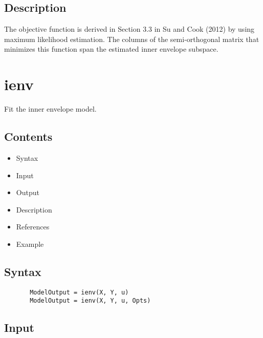 \documentclass[a4paper,11pt,openany]{memoir}
\begin{document}
\subsection*{Description}

\begin{par}
The objective function is derived in Section 3.3 in Su and Cook (2012) by  using maximum likelihood estimation. The columns of the semi-orthogonal matrix that minimizes this function span the estimated inner envelope subspace.
\end{par} \vspace{1em}

\newpage

\rmfamily
\color{black}\section{ienv}

\begin{par}
Fit the inner envelope model.
\end{par} \vspace{1em}

\subsection*{Contents}

\begin{itemize}
\setlength{\itemsep}{-1ex}
   \item Syntax
   \item Input
   \item Output
   \item Description
   \item References
   \item Example
\end{itemize}


\subsection*{Syntax}


\begin{verbatim}       ModelOutput = ienv(X, Y, u)
       ModelOutput = ienv(X, Y, u, Opts)\end{verbatim}
    

\subsection*{Input}
\end{document}
